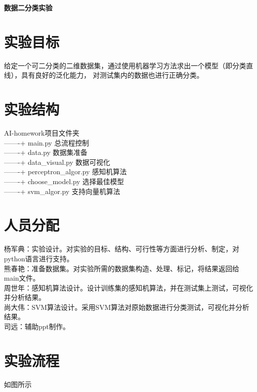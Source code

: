 \documentclass[UTF8,twoside,fontset=none,heading=true,scheme=chinese]{ctexart}
\newcommand{\erhao}{\fontsize{22pt}{33pt}\selectfont}
\newcommand{\wuhao}{\fontsize{10.5pt}{15.75pt}\selectfont}
\begin{document}
\wuhao

    \begin{center}
        \vspace{6pt}
        \erhao \textbf{
        数据二分类实验
        }
        \vspace{8pt}
    \end{center}

    \section{实验目标}
    \noindent 给定一个可二分类的二维数据集，通过使用机器学习方法求出一个模型（即分类直线），具有良好的泛化能力，
    对测试集内的数据也进行正确分类。

    \section{实验结构}
    \noindent AI-homework\quad 项目文件夹 \\    
    -------+ main.py  \qquad 总流程控制 \\
    -------+ data.py  \qquad 数据集准备 \\  
    -------+ data\_visual.py  \qquad 数据可视化 \\
    -------+ perceptron\_algor.py  \qquad 感知机算法 \\
    -------+ choose\_model.py  \qquad 选择最佳模型 \\
    -------+ svm\_algor.py  \qquad 支持向量机算法 \\

    \section{人员分配}
    \noindent 杨军典：实验设计。对实验的目标、结构、可行性等方面进行分析、制定，对python语言进行支持。\\
    熊春艳：准备数据集。对实验所需的数据集构造、处理、标记，将结果返回给main文件。\\
    周世年：感知机算法设计。设计训练集的感知机算法，并在测试集上测试，可视化并分析结果。\\
    尚大伟：SVM算法设计。采用SVM算法对原始数据进行分类测试，可视化并分析结果。 \\
    司远：辅助ppt制作。

    \section{实验流程}
    \noindent 如图所示
\end{document}
